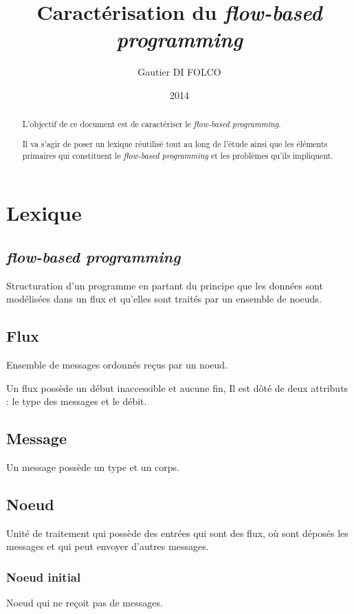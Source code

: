 \documentclass{article}
\title{Caractérisation du \emph{flow-based programming}}
\author{Gautier DI FOLCO}
\date{2014}
\begin{document}
\maketitle
\tableofcontents

\begin{abstract}
L'objectif de ce document est de caractériser le \emph{flow-based programming}.

Il va s'agir de poser un lexique réutilisé tout au long de l'étude ainsi que les
éléments primaires qui constituent le \emph{flow-based programming} et les problèmes
qu'ils impliquent.
\end{abstract}

\section{Lexique}
\subsection{\emph{flow-based programming}}
Structuration d'un programme en partant du principe que les données sont modélisées
dans un flux et qu'elles sont traités par un ensemble de noeuds.

\subsection{Flux}
Ensemble de messages ordonnés reçus par un noeud.

Un flux possède un début inaccessible et aucune fin, Il est dôté de deux attributs :
le type des messages et le débit.

\subsection{Message}
Un message possède un type et un corps.

\subsection{Noeud}
Unité de traitement qui possède des entrées qui sont des flux, où sont déposés
les messages et qui peut envoyer d'autres messages.

\subsubsection{Noeud initial}
Noeud qui ne reçoit pas de messages.
\end{document}
